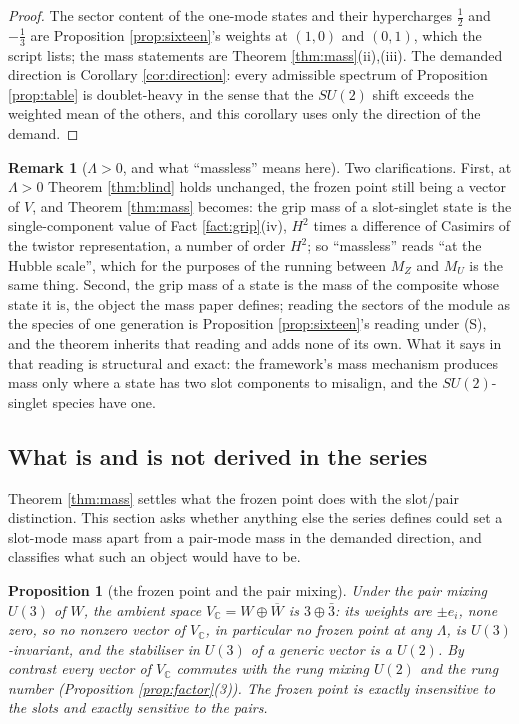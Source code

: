 \documentclass[11pt]{article}
\newtheorem{proposition}[theorem]{Proposition}
\theoremstyle{definition}
\newtheorem{remark}[theorem]{Remark}
\newcommand{\C}{\mathbb{C}}
\begin{document}
\begin{proof}
The sector content of the one-mode states and their hypercharges $\tfrac12$ and $-\tfrac13$ are Proposition \ref{prop:sixteen}'s weights at $(1,0)$ and $(0,1)$, which the script lists; the mass statements are Theorem \ref{thm:mass}(ii),(iii). The demanded direction is Corollary \ref{cor:direction}: every admissible spectrum of Proposition \ref{prop:table} is doublet-heavy in the sense that the $SU(2)$ shift exceeds the weighted mean of the others, and this corollary uses only the direction of the demand.
\end{proof}

\begin{remark}[$\Lambda > 0$, and what ``massless'' means here]\label{rem:lambda}
Two clarifications. First, at $\Lambda > 0$ Theorem \ref{thm:blind} holds unchanged, the frozen point still being a vector of $V$, and Theorem \ref{thm:mass} becomes: the grip mass of a slot-singlet state is the single-component value of Fact \ref{fact:grip}(iv), $H^{2}$ times a difference of Casimirs of the twistor representation, a number of order $H^{2}$; so ``massless'' reads ``at the Hubble scale'', which for the purposes of the running between $M_{Z}$ and $M_{U}$ is the same thing. Second, the grip mass of a state is the mass of the composite whose state it is, the object the mass paper defines; reading the sectors of the module as the species of one generation is Proposition \ref{prop:sixteen}'s reading under (S), and the theorem inherits that reading and adds none of its own. What it says in that reading is structural and exact: the framework's mass mechanism produces mass only where a state has two slot components to misalign, and the $SU(2)$-singlet species have one.
\end{remark}

\subsection{What is and is not derived in the series}\label{subsec:books}

Theorem \ref{thm:mass} settles what the frozen point does with the slot/pair distinction. This section asks whether anything else the series defines could set a slot-mode mass apart from a pair-mode mass in the demanded direction, and classifies what such an object would have to be.

\begin{proposition}[the frozen point and the pair mixing]\label{prop:mixing}
Under the pair mixing $U(3)$ of $W$, the ambient space $V_{\C} = W \oplus \overline{W}$ is $3 \oplus \bar{3}$: its weights are $\pm e_{i}$, none zero, so no nonzero vector of $V_{\C}$, in particular no frozen point at any $\Lambda$, is $U(3)$-invariant, and the stabiliser in $U(3)$ of a generic vector is a $U(2)$. By contrast every vector of $V_{\C}$ commutes with the rung mixing $U(2)$ and the rung number (Proposition \ref{prop:factor}(3)). The frozen point is exactly insensitive to the slots and exactly sensitive to the pairs.
\end{proposition}
\end{document}
